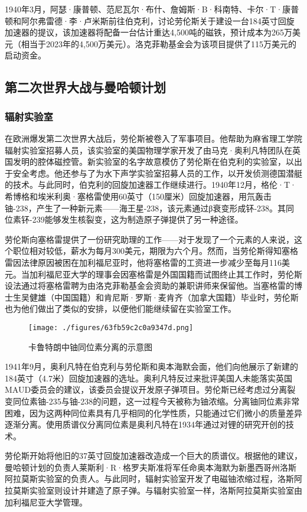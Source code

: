 1940年3月，阿瑟·康普顿、范尼瓦尔·布什、詹姆斯·B·科南特、卡尔·T·康普顿和阿尔弗雷德·李·卢米斯前往伯克利，讨论劳伦斯关于建设一台184英寸回旋加速器的提议，该加速器将配备一台估计重达4,500吨的磁铁，预计成本为265万美元（相当于2023年的4,500万美元）。洛克菲勒基金会为该项目提供了115万美元的启动资金。
\subsection{第二次世界大战与曼哈顿计划}
\subsubsection{辐射实验室}
在欧洲爆发第二次世界大战后，劳伦斯被卷入了军事项目。他帮助为麻省理工学院辐射实验室招募人员，该实验室的美国物理学家开发了由马克·奥利凡特团队在英国发明的腔体磁控管。新实验室的名字故意模仿了劳伦斯在伯克利的实验室，以出于安全考虑。他还参与了为水下声学实验室招募人员的工作，以开发侦测德国潜艇的技术。与此同时，伯克利的回旋加速器工作继续进行。1940年12月，格伦·T·希博格和埃米利奥·塞格雷使用60英寸（150厘米）回旋加速器，用氘轰击铀-238，产生了一种新元素——海王星-238，该元素通过β衰变形成钚-238。其同位素钚-239能够发生核裂变，这为制造原子弹提供了另一种途径。

劳伦斯向塞格雷提供了一份研究助理的工作——对于发现了一个元素的人来说，这个职位相对较低，薪水为每月300美元，期限为六个月。然而，当劳伦斯得知塞格雷因法律原因被困在加利福尼亚时，他将塞格雷的工资进一步减少至每月116美元。当加利福尼亚大学的理事会因塞格雷是外国国籍而试图终止其工作时，劳伦斯设法通过将塞格雷聘为由洛克菲勒基金会资助的兼职讲师来保留他。当塞格雷的博士生吴健雄（中国国籍）和肯尼斯·罗斯·麦肯齐（加拿大国籍）毕业时，劳伦斯也为他们做出了类似的安排，以便他们能继续留在实验室工作。
\begin{figure}[ht]
\centering
\texttt{[image: ./figures/63fb59c2c0a9347d.png]}
\caption{卡鲁特朗中铀同位素分离的示意图} \label{fig_ONST_5}
\end{figure}
1941年9月，奥利凡特在伯克利与劳伦斯和奥本海默会面，他们向他展示了新建的184英寸（4.7米）回旋加速器的选址。奥利凡特反过来批评美国人未能落实英国MAUD委员会的建议，该委员会提议开发原子弹项目。劳伦斯已经考虑过分离裂变同位素铀-235与铀-238的问题，这一过程今天被称为铀浓缩。分离铀同位素非常困难，因为这两种同位素具有几乎相同的化学性质，只能通过它们微小的质量差异逐渐分离。使用质谱仪分离同位素是奥利凡特在1934年通过对锂的研究开创的技术。

劳伦斯开始将他旧的37英寸回旋加速器改造成一个巨大的质谱仪。根据他的建议，曼哈顿计划的负责人莱斯利·R·格罗夫斯准将军任命奥本海默为新墨西哥州洛斯阿拉莫斯实验室的负责人。与此同时，辐射实验室开发了电磁铀浓缩过程，洛斯阿拉莫斯实验室则设计并建造了原子弹。与辐射实验室一样，洛斯阿拉莫斯实验室由加利福尼亚大学管理。

